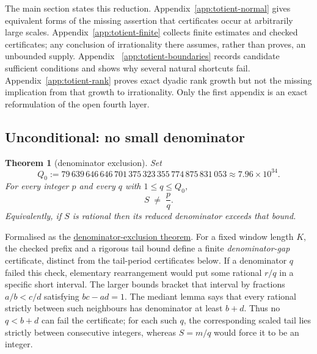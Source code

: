 \documentclass[11pt]{article}
\newcommand{\commit}{99f4bf47422abbd8757cbb22b50ba079d764d3a7}
\newcommand{\repobase}{https://github.com/wcook04/plectis-erdos/blob/\commit}
\newcommand{\PK}{Erdos249257}
\newcommand{\lword}[4]{\href{\repobase/\PK/#1\#L#2}{#4}}
\newtheorem{theorem}{Theorem}[section]
\theoremstyle{definition}
\theoremstyle{remark}
\newcommand{\Qzero}{Q_0}
\begin{document}
The main section states this reduction.  Appendix~\ref{app:totient-normal}
gives equivalent forms of the missing assertion that certificates occur at
arbitrarily large scales.  Appendix~\ref{app:totient-finite} collects finite
estimates and checked certificates; any conclusion of irrationality there
assumes, rather than proves, an unbounded supply.  Appendix~
\ref{app:totient-boundaries} records candidate sufficient conditions and
shows why several natural shortcuts fail.  Appendix~\ref{app:totient-rank}
proves exact dyadic rank growth but not the missing implication from that
growth to irrationality.  Only the first appendix is an exact reformulation
of the open fourth layer.

\subsection{Unconditional: no small denominator}\label{sec:uncond}

\begin{theorem}[denominator exclusion]\label{res:farey}
Set
\[
\Qzero:=79\,639\,646\,646\,701\,375\,323\,355\,774\,875\,831\,053
       \approx7.96\times10^{34}.
\]
For every integer $p$ and every $q$ with $1\le q\le\Qzero$,
\[
S \;\ne\; \frac{p}{q}.
\]
Equivalently, if $S$ is rational then its reduced denominator exceeds that bound.
\end{theorem}
\noindent Formalised as the
\lword{CertificateKernel.lean}{18384}{tsum_totient_div_pow_two_ne_ratCast_of_den_le_79639646646701375323355774875831053}{denominator-exclusion theorem}.
For a fixed window length $K$, the checked prefix and a rigorous tail bound
define a finite \emph{denominator-gap} certificate, distinct from the
tail-period certificates below.  If a denominator $q$ failed this check,
elementary rearrangement would put some rational $r/q$ in a specific short
interval.  The larger bounds bracket that interval by fractions
$a/b<c/d$ satisfying $bc-ad=1$.  The mediant lemma says that every rational
strictly between such neighbours has denominator at least $b+d$.  Thus no
$q<b+d$ can fail the certificate; for each such $q$, the corresponding scaled
tail lies strictly between consecutive integers, whereas $S=m/q$ would force it
to be an integer.
\end{document}
